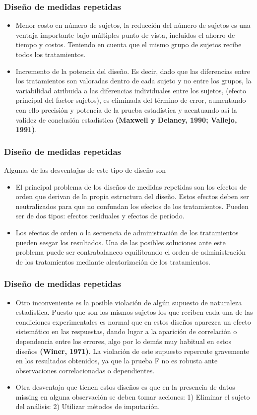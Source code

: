 \documentclass[12pt]{beamer}
\begin{document}
\begin{frame}
\frametitle{Diseño de medidas repetidas}
\begin{itemize}
\justifying
\item Menor costo en número de sujetos, la reducción del número de sujetos es una ventaja
importante bajo múltiples punto de vista, incluidos el ahorro de tiempo y costos. Teniendo en
cuenta que el mismo grupo de sujetos recibe todos los tratamientos.
\item Incremento de la potencia del diseño. Es decir, dado que las diferencias entre los tratamientos
son valoradas dentro de cada sujeto y no entre los grupos, la variabilidad atribuida a las
diferencias individuales entre los sujetos, (efecto principal del factor sujetos), es eliminada del
término de error, aumentando con ello precisión y potencia de la prueba estadística y
acentuando así la validez de conclusión estadística \textbf{(Maxwell y Delaney, 1990; Vallejo, 1991)}.
\end{itemize}
\end{frame}

\begin{frame}
\frametitle{Diseño de medidas repetidas}
Algunas de las desventajas de este tipo de diseño son
\begin{itemize}
\justifying
\item El principal problema de los diseños de medidas repetidas son los efectos de orden que
derivan de la propia estructura del diseño. Estos efectos deben ser neutralizados para que no
confundan los efectos de los tratamientos. Pueden ser de dos tipos: efectos residuales y
efectos de período.
\item Los efectos de orden o la secuencia de administración de los tratamientos pueden sesgar los
resultados. Una de las posibles soluciones ante este problema puede ser contrabalanceo
equilibrando el orden de administración de los tratamientos mediante aleatorización de los
tratamientos.
\end{itemize}
\end{frame}

\begin{frame}
\frametitle{Diseño de medidas repetidas}
\begin{itemize}
\justifying
\item Otro inconveniente es la posible violación de algún supuesto de naturaleza estadística. Puesto que son los mismos sujetos los
que reciben cada una de las condiciones experimentales es normal que en estos diseños
aparezca un efecto sistemático en las respuestas, dando lugar a la aparición de correlación o
dependencia entre los errores, algo por lo demás muy habitual en estos diseños \textbf{(Winer, 1971)}.
La violación de este supuesto repercute gravemente en los resultados obtenidos, ya que la
prueba F no es robusta ante observaciones correlacionadas o dependientes.
\item Otra desventaja que tienen estos diseños es que en la presencia de datos missing en alguna
observación se deben tomar acciones: 1) Eliminar el sujeto del análisis: 2) Utilizar métodos de
imputación.
\end{itemize}
\end{frame}
\end{document}
